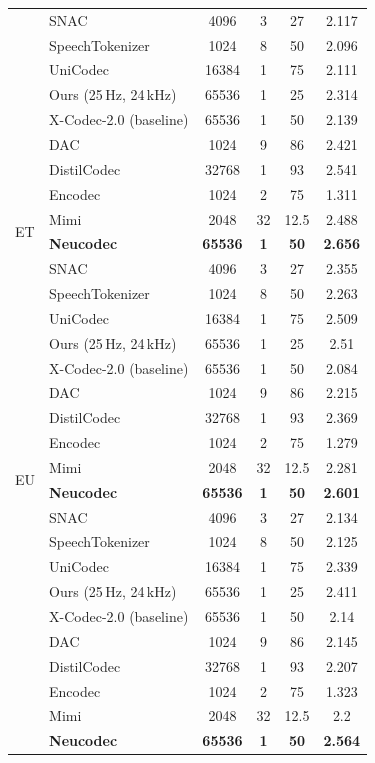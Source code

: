 \documentclass[preprint]{article}
\begin{document}
\begin{longtable}{llcccc}
  & SNAC & 4096 & 3 & 27 & 2.117 \\
  & SpeechTokenizer & 1024 & 8 & 50 & 2.096 \\
  & UniCodec & 16384 & 1 & 75 & 2.111 \\
  & Ours (25\,Hz, 24\,kHz) & 65536 & 1 & 25 & 2.314 \\
  & X-Codec-2.0 (baseline) & 65536 & 1 & 50 & 2.139 \\
\midrule
\multirow{8}{*}{ET}
  & DAC & 1024 & 9 & 86 & 2.421 \\
  & DistilCodec & 32768 & 1 & 93 & 2.541 \\
  & Encodec & 1024 & 2 & 75 & 1.311 \\
  & Mimi & 2048 & 32 & 12.5 & 2.488 \\
  & \textbf{Neucodec} & \textbf{65536} & \textbf{1} & \textbf{50} & \textbf{2.656} \\
  & SNAC & 4096 & 3 & 27 & 2.355 \\
  & SpeechTokenizer & 1024 & 8 & 50 & 2.263 \\
  & UniCodec & 16384 & 1 & 75 & 2.509 \\
  & Ours (25\,Hz, 24\,kHz) & 65536 & 1 & 25 & 2.51 \\
  & X-Codec-2.0 (baseline) & 65536 & 1 & 50 & 2.084 \\
\midrule
\multirow{8}{*}{EU}
  & DAC & 1024 & 9 & 86 & 2.215 \\
  & DistilCodec & 32768 & 1 & 93 & 2.369 \\
  & Encodec & 1024 & 2 & 75 & 1.279 \\
  & Mimi & 2048 & 32 & 12.5 & 2.281 \\
  & \textbf{Neucodec} & \textbf{65536} & \textbf{1} & \textbf{50} & \textbf{2.601} \\
  & SNAC & 4096 & 3 & 27 & 2.134 \\
  & SpeechTokenizer & 1024 & 8 & 50 & 2.125 \\
  & UniCodec & 16384 & 1 & 75 & 2.339 \\
  & Ours (25\,Hz, 24\,kHz) & 65536 & 1 & 25 & 2.411 \\
  & X-Codec-2.0 (baseline) & 65536 & 1 & 50 & 2.14 \\
\newpage
\multirow{8}{*}{FA}
  & DAC & 1024 & 9 & 86 & 2.145 \\
  & DistilCodec & 32768 & 1 & 93 & 2.207 \\
  & Encodec & 1024 & 2 & 75 & 1.323 \\
  & Mimi & 2048 & 32 & 12.5 & 2.2 \\
  & \textbf{Neucodec} & \textbf{65536} & \textbf{1} & \textbf{50} & \textbf{2.564} \\

\end{longtable}
\end{document}
